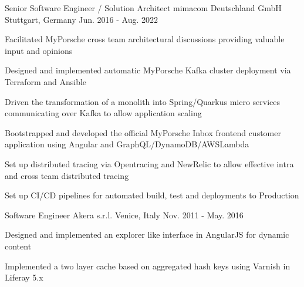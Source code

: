 \begin{cventries}
  \cventry
    {Senior Software Engineer / Solution Architect} %
    {mimacom Deutschland GmbH} %
    {Stuttgart, Germany} %
    {Jun. 2016 - Aug. 2022} %
    {
      \begin{cvitems} %
        \item {Facilitated MyPorsche cross team architectural discussions providing valuable input and opinions}
        \item {Designed and implemented automatic MyPorsche Kafka cluster deployment via Terraform and Ansible}
        \item {Driven the transformation of a monolith into Spring/Quarkus micro services communicating over Kafka to allow application scaling}
        \item {Bootstrapped and developed the official MyPorsche Inbox frontend customer application using Angular and GraphQL/DynamoDB/AWSLambda}
        \item {Set up distributed tracing via Opentracing and NewRelic to allow effective intra and cross team distributed tracing}
        \item {Set up CI/CD pipelines for automated build, test and deployments to Production}
      \end{cvitems}
    }

  \cventry
    {Software Engineer} %
    {Akera s.r.l.} %
    {Venice, Italy} %
    {Nov. 2011 - May. 2016} %
    {
      \begin{cvitems} %
        \item {Designed and implemented an explorer like interface in AngularJS for dynamic content}
        \item {Implemented a two layer cache based on aggregated hash keys using Varnish in Liferay 5.x}
      \end{cvitems}
    }

\end{cventries}
